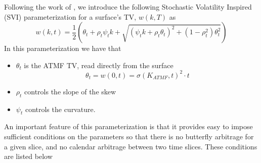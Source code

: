 \documentclass[11pt,letterpaper]{article}
\begin{document}
%


\label{sss:SVI}

Following the work of \cite{corbetta2019robust}, we introduce the following Stochastic Volatility Inspired (SVI) parameterization for a surface's TV, $w(k,T)$ as
\begin{equation}
w(k,t) = \frac{1}{2}\left(\theta_t  + \rho_t \psi_t k + \sqrt{ \left(\psi_t k + \rho_t \theta_t \right)^2 + \left(1 - \rho_t^2 \right)\theta_t^2 } \right)
\label{eqn:w}
\end{equation}
In this parameterization we have that 
\begin{itemize}
\item $\theta_t$ is the ATMF TV, read directly from the surface
\[
\theta_t = w(0,t) = \sigma(K_{ATMF},t)^2 \cdot t
\]
\item $\rho_t$ controls the slope of the skew 
\item $\psi_t$ controls the curvature. 
\end{itemize}

An important feature of this parameterization is that it provides easy to impose sufficient conditions on the parameters so that there is no butterfly arbitrage for a given slice, and no calendar arbitrage between two time slices. These conditions are listed below
\end{document}
